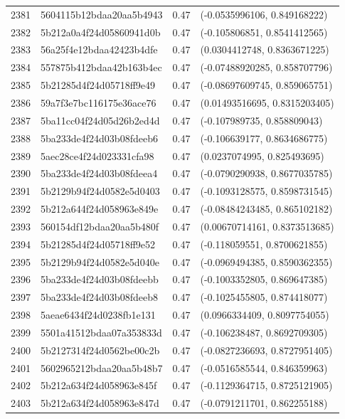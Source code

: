\begin{table}[ht]
\begin{tabular}{rlrl}
  2381 & 5604115b12bdaa20aa5b4943 & 0.47 & (-0.0535996106, 0.849168222) \\ 
  2382 & 5b212a0a4f24d05860941d0b & 0.47 & (-0.105806851, 0.8541412565) \\ 
  2383 & 56a25f4e12bdaa42423b4dfe & 0.47 & (0.0304412748, 0.8363671225) \\ 
  2384 & 557875b412bdaa42b163b4ec & 0.47 & (-0.07488920285, 0.858707796) \\ 
  2385 & 5b21285d4f24d05718ff9e49 & 0.47 & (-0.08697609745, 0.859065751) \\ 
  2386 & 59a7f3e7bc116175e36ace76 & 0.47 & (0.01493516695, 0.8315203405) \\ 
  2387 & 5ba11cc04f24d05d26b2ed4d & 0.47 & (-0.107989735, 0.858809043) \\ 
  2388 & 5ba233de4f24d03b08fdeeb6 & 0.47 & (-0.106639177, 0.8634686775) \\ 
  2389 & 5aec28ce4f24d023331cfa98 & 0.47 & (0.0237074995, 0.825493695) \\ 
  2390 & 5ba233de4f24d03b08fdeea4 & 0.47 & (-0.0790290938, 0.8677035785) \\ 
  2391 & 5b2129b94f24d0582e5d0403 & 0.47 & (-0.1093128575, 0.8598731545) \\ 
  2392 & 5b212a644f24d058963e849e & 0.47 & (-0.08484243485, 0.865102182) \\ 
  2393 & 560154df12bdaa20aa5b480f & 0.47 & (0.00670714161, 0.8373513685) \\ 
  2394 & 5b21285d4f24d05718ff9e52 & 0.47 & (-0.118059551, 0.8700621855) \\ 
  2395 & 5b2129b94f24d0582e5d040e & 0.47 & (-0.0969494385, 0.8590362355) \\ 
  2396 & 5ba233de4f24d03b08fdeebb & 0.47 & (-0.1003352805, 0.869647385) \\ 
  2397 & 5ba233de4f24d03b08fdeeb8 & 0.47 & (-0.1025455805, 0.874418077) \\ 
  2398 & 5aeae6434f24d0238fb1e131 & 0.47 & (0.0966334409, 0.8097754055) \\ 
  2399 & 5501a41512bdaa07a353833d & 0.47 & (-0.106238487, 0.8692709305) \\ 
  2400 & 5b2127314f24d0562be00c2b & 0.47 & (-0.0827236693, 0.8727951405) \\ 
  2401 & 5602965212bdaa20aa5b48b7 & 0.47 & (-0.0516585544, 0.846359963) \\ 
  2402 & 5b212a634f24d058963e845f & 0.47 & (-0.1129364715, 0.8725121905) \\ 
  2403 & 5b212a634f24d058963e847d & 0.47 & (-0.0791211701, 0.862255188) \\ 

\end{tabular}
\end{table}
